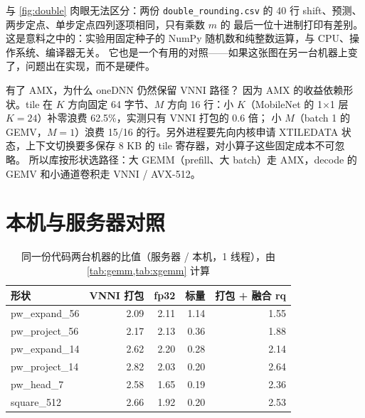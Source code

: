 \documentclass[11pt,a4paper]{ctexart}
\begin{document}
 与 \cref{fig:double} 肉眼无法区分：两份 \texttt{double\_rounding.csv} 的 40 行 shift、预测、两步定点、单步定点四列逐项相同，只有乘数 $m$ 的
最后一位十进制打印有差别。这是意料之中的：实验用固定种子的 NumPy 随机数和纯整数运算，与 CPU、操作系统、编译器无关。
它也是一个有用的对照——如果这张图在另一台机器上变了，问题出在实现，而不是硬件。

\begin{iqbox}{有了 AMX，为什么 oneDNN 仍然保留 VNNI 路径？}
因为 AMX 的收益依赖形状。tile 在 $K$ 方向固定 64 字节、$M$ 方向 16 行：小 $K$（MobileNet 的 1$\times$1 层 $K=24$）补零浪费 62.5\%，实测只有 VNNI 打包的 0.6 倍；
小 $M$（batch 1 的 GEMV，$M=1$）浪费 15/16 的行。另外进程要先向内核申请 XTILEDATA 状态，上下文切换要多保存 8 KB 的 tile 寄存器，对小算子这些固定成本不可忽略。
所以库按形状选路径：大 GEMM（prefill、大 batch）走 AMX，decode 的 GEMV 和小通道卷积走 VNNI / AVX-512。
\end{iqbox}

\section{本机与服务器对照}\label{sec:host}

\begin{table}[H]
\centering\small
\caption{同一份代码两台机器的比值（服务器 / 本机，1 线程），由 \cref{tab:gemm,tab:xgemm} 计算}\label{tab:cross}
\begin{tabular}{lrrrr}
\toprule
形状 & VNNI 打包 & fp32 & 标量 & 打包 + 融合 rq \\
\midrule
pw\_expand\_56 & 2.09 & 2.11 & 1.14 & 1.55 \\
pw\_project\_56 & 2.17 & 2.13 & 0.36 & 1.88 \\
pw\_expand\_14 & 2.62 & 2.20 & 0.28 & 2.14 \\
pw\_project\_14 & 2.82 & 2.03 & 0.20 & 2.64 \\
pw\_head\_7 & 2.58 & 1.65 & 0.19 & 2.36 \\
square\_512 & 2.66 & 1.92 & 0.20 & 2.53 \\
\bottomrule
\end{tabular}
\end{table}
\end{document}
